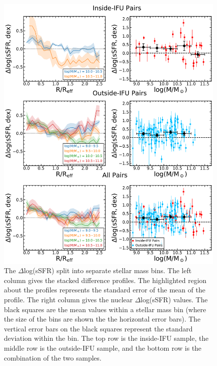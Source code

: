 \documentclass[iop,revtex4,twocolumn,apj,numberedappendix,appendixfloats]{emulateapj}
\begin{document}
\begin{figure}
\centering
\includegraphics[width=\linewidth]{fig/ssfr_mass.pdf}
\caption[The $\Delta$log(sSFR) split by stellar mass.]{The $\Delta$log(sSFR) split into separate stellar mass bins. The left column gives the stacked difference profiles. The highlighted region about the profiles represents the standard error of the mean of the profile. The right column gives the nuclear $\Delta$log(sSFR) values. The black squares are the mean values within a stellar mass bin (where the size of the bins are shown the the horizontal error bars). The vertical error bars on the black squares represent the standard deviation within the bin. The top row is the inside-IFU sample, the middle row is the outside-IFU sample, and the bottom row is the combination of the two samples.}
\label{fig:ssfr_mass}
\end{figure}
\end{document}
